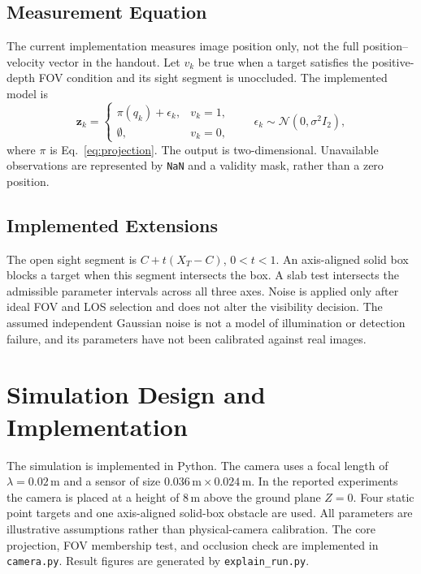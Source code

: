 \documentclass[11pt,letterpaper]{article}
\begin{document}
\subsection{Measurement Equation}
The current implementation measures image position only, not the full position--velocity vector in the handout. Let $v_k$ be true when a target satisfies the positive-depth FOV condition and its sight segment is unoccluded. The implemented model is
\begin{equation}
\mathbf{z}_k=\begin{cases}
\pi(q_k)+\epsilon_k,&v_k=1,\\
\emptyset,&v_k=0,
\end{cases}
\qquad \epsilon_k\sim\mathcal{N}(0,\sigma^2 I_2),
\label{eq:measurement}
\end{equation}
where $\pi$ is Eq.~\eqref{eq:projection}. The output is two-dimensional. Unavailable observations are represented by \texttt{NaN} and a validity mask, rather than a zero position.

\subsection{Implemented Extensions}
The open sight segment is $C+t(X_T-C)$, $0<t<1$. An axis-aligned solid box blocks a target when this segment intersects the box. A slab test intersects the admissible parameter intervals across all three axes. Noise is applied only after ideal FOV and LOS selection and does not alter the visibility decision. The assumed independent Gaussian noise is not a model of illumination or detection failure, and its parameters have not been calibrated against real images.

\section{Simulation Design and Implementation}
\label{sec:sim}
The simulation is implemented in Python. The camera uses a focal length of $\lambda = 0.02$\,m and a sensor of size $0.036\,\text{m} \times 0.024\,\text{m}$. In the reported experiments the camera is placed at a height of 8\,m above the ground plane $Z=0$. Four static point targets and one axis-aligned solid-box obstacle are used. All parameters are illustrative assumptions rather than physical-camera calibration. The core projection, FOV membership test, and occlusion check are implemented in \texttt{camera.py}. Result figures are generated by \texttt{explain\_run.py}.
\end{document}
